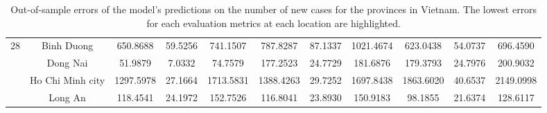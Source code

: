 \begin{landscape}
\begin{table}[!htb]
\begin{tabular}{| c | c | c | c | c | c | c | c | c | c | c |}
        \multirow{4}{*}{28}
            & Binh Duong & 650.8688 & 59.5256 & 741.1507 & 787.8287 & 87.1337 & 1021.4674 & 623.0438 & 54.0737 & 696.4590
            \\ \cline{2-11}
            & Dong Nai & 51.9879 & 7.0332 & 74.7579 & 177.2523 & 24.7729 & 181.6876 & 179.3793 & 24.7976 & 200.9032
            \\ \cline{2-11}
            & Ho Chi Minh city & 1297.5978 & 27.1664 & 1713.5831 & 1388.4263 & 29.7252 & 1697.8438 & 1863.6020 & 40.6537 & 2149.0998
            \\ \cline{2-11}
            & Long An & 118.4541 & 24.1972 & 152.7526 & 116.8041 & 23.8930 & 150.9183 & 98.1855 & 21.6374 & 128.6117
            \\
        \hline
    \end{tabular}
    \caption{Out-of-sample errors of the model's predictions on the number of new cases for the provinces in Vietnam. The lowest errors for each evaluation metrics at each location are highlighted.}
\end{table}
\end{landscape}

